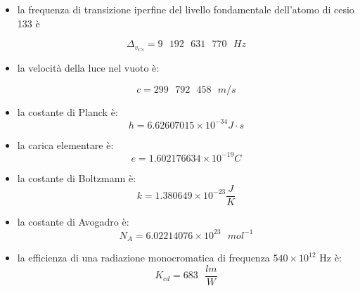 \begin{itemize}
    \item la frequenza di transizione iperfine del livello fondamentale dell'atomo di cesio 133 è 
    {
        \Large 
        \begin{equation}
            \Delta_{v_{Cs}} = 9\text{ }192 \text{ }631 \text{ } 770 \text{ } Hz
        \end{equation}

    } 

    \item la velocità della luce nel vuoto è: 
    {
        \Large 
        \begin{equation}
            c = 299 \text{ } 792 \text{ } 458 \text{ } m/s
        \end{equation}

    }

    \item la costante di Planck è: 
    {
        \Large 
        \begin{equation}
            h = 6.626\text{}070\text{}15 \times 10^{-34} J \cdot s
        \end{equation}
    }
    
    \item la carica elementare è: 
    {
        \Large 
        \begin{equation}
            e = 1.602\text{}176\text{}634 \times 10^{-19}\text{} C
        \end{equation}
    }
    
    \item la costante di Boltzmann è:
    {
        \Large 
        \begin{equation}
            k = 1.380 \text{}649 \times 10^{-23} \text{} \frac{J}{K}
        \end{equation}
    } 
    
    \item la costante di Avogadro è: 
    {
        \Large 
        \begin{equation}
            N_A = 6.022 \text{} 140 \text{} 76 \times 10^{23} \text{ } mol^{-1}
        \end{equation}
    }
    
    \item la efficienza di una radiazione monocromatica di frequenza $540 \times 10^{12}$ Hz è:  
    {
        \Large
        \begin{equation}
            K_{cd} = 683 \text{ } \frac{lm}{W}
        \end{equation}
    }
\end{itemize}


